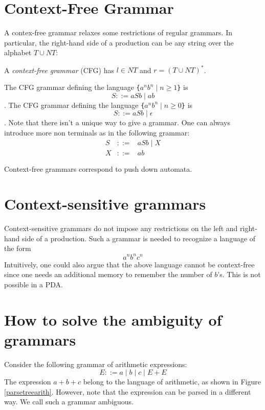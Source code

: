 \documentclass{article}
\begin{document}
\section{Context-Free Grammar}
A contex-free grammar relaxes some restrictions of regular grammars.
In particular, the right-hand side of a production can be any string over the
alphabet $T \cup NT$:

\begin{definition}
A {\emph{context-free grammar}}  (CFG) has $l \in NT $ and $ r =  (T \cup NT)^*$.
\end{definition}


\begin{example}
The CFG grammar defining the language 
\verb|{|$a^{n}b^{n}\mid n \geq 1$\verb|}| 
is
 $$S ::= aSb \mid ab$$.
 The CFG grammar defining the language 
\verb|{|$a^{n}b^{n}\mid n \geq 0$\verb|}| 
is
 $$S ::= aSb \mid \epsilon$$.
Note that there isn't a unique way to give a grammar. One can always introduce
more non terminals as in the following grammar:
$$\begin{array}{lll}
S & ::= &  aSb \mid X \\
X & ::= &  ab 
\end{array}$$
\end{example}


Context-free grammars correspond to push down automata.


\section{Context-sensitive grammars}
Context-sensitive grammars do not impose any restrictions
on the left and right-hand side of a production. Such a grammar
is needed to recognize a language of the form
           $$a^{n}b^{n}c^{n}$$
Intuitively, one could also argue that the above language cannot be context-free since
one needs an additional memory to remember the number of $b$'s. This is not possible
in a PDA.

\section{How to solve the ambiguity of grammars}
Consider the following grammar of arithmetic expressions: 
$$ E ::= a \mid  b  \mid  c  \mid  E + E $$
The expression $a+b+c$ belong to the language of arithmetic,
as shown in Figure \ref{parsetreearith}. However, note that the expression can be parsed
in a different way. We call such a grammar {\color{red} ambiguous}.
\end{document}
